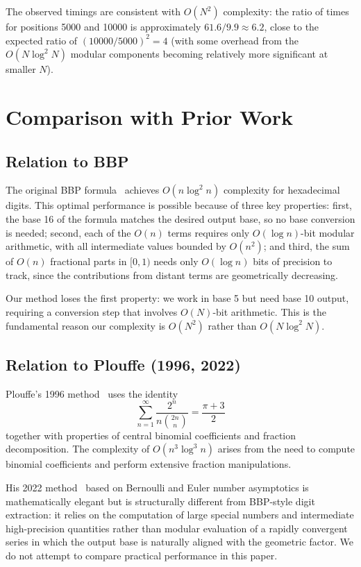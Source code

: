 \documentclass[11pt]{article}
\begin{document}
The observed timings are consistent with $O(N^2)$ complexity: the ratio of times for positions 5000 and 10000 is approximately $61.6/9.9 \approx 6.2$, close to the expected ratio of $(10000/5000)^2 = 4$ (with some overhead from the $O(N \log^2 N)$ modular components becoming relatively more significant at smaller $N$).

\section{Comparison with Prior Work}

\subsection{Relation to BBP}

The original BBP formula~\cite{bbp1997} achieves $O(n \log^2 n)$ complexity for hexadecimal digits. This optimal performance is possible because of three key properties: first, the base 16 of the formula matches the desired output base, so no base conversion is needed; second, each of the $O(n)$ terms requires only $O(\log n)$-bit modular arithmetic, with all intermediate values bounded by $O(n^2)$; and third, the sum of $O(n)$ fractional parts in $[0,1)$ needs only $O(\log n)$ bits of precision to track, since the contributions from distant terms are geometrically decreasing.

Our method loses the first property: we work in base 5 but need base 10 output, requiring a conversion step that involves $O(N)$-bit arithmetic. This is the fundamental reason our complexity is $O(N^2)$ rather than $O(N \log^2 N)$.

\subsection{Relation to Plouffe (1996, 2022)}

Plouffe's 1996 method~\cite{plouffe1996} uses the identity
\[
\sum_{n=1}^{\infty} \frac{2^n}{n \binom{2n}{n}} = \frac{\pi + 3}{2}
\]
together with properties of central binomial coefficients and fraction decomposition. The complexity of $O(n^3 \log^3 n)$ arises from the need to compute binomial coefficients and perform extensive fraction manipulations.

His 2022 method~\cite{plouffe2022} based on Bernoulli and Euler number asymptotics is mathematically elegant but is structurally different from BBP-style digit extraction: it relies on the computation of large special numbers and intermediate high-precision quantities rather than modular evaluation of a rapidly convergent series in which the output base is naturally aligned with the geometric factor. We do not attempt to compare practical performance in this paper.
\end{document}
